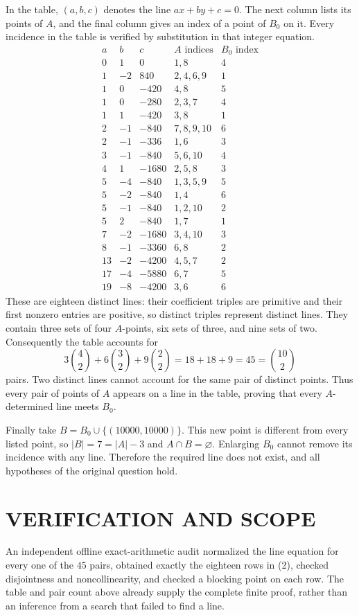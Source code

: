 In the table, $(a,b,c)$ denotes the line $ax+by+c=0$. The next column lists its points of $A$, and the final column gives an index of a point of $B_0$ on it. Every incidence in the table is verified by substitution in that integer equation.
\[
\begin{array}{r|r|r|l|c}
a&b&c&A\text{ indices}&B_0\text{ index}\\\hline
0&1&0&1,8&4\\
1&-2&840&2,4,6,9&1\\
1&0&-420&4,8&5\\
1&0&-280&2,3,7&4\\
1&1&-420&3,8&1\\
2&-1&-840&7,8,9,10&6\\
2&-1&-336&1,6&3\\
3&-1&-840&5,6,10&4\\
4&1&-1680&2,5,8&3\\
5&-4&-840&1,3,5,9&5\\
5&-2&-840&1,4&6\\
5&-1&-840&1,2,10&2\\
5&2&-840&1,7&1\\
7&-2&-1680&3,4,10&3\\
8&-1&-3360&6,8&2\\
13&-2&-4200&4,5,7&2\\
17&-4&-5880&6,7&5\\
19&-8&-4200&3,6&6
\end{array}
\tag{2}
\]
These are eighteen distinct lines: their coefficient triples are primitive and their first nonzero entries are positive, so distinct triples represent distinct lines. They contain three sets of four $A$-points, six sets of three, and nine sets of two. Consequently the table accounts for
\[
3\binom42+6\binom32+9\binom22=18+18+9=45=\binom{10}2
\]
pairs. Two distinct lines cannot account for the same pair of distinct points. Thus every pair of points of $A$ appears on a line in the table, proving that every $A$-determined line meets $B_0$.

Finally take $B=B_0\cup\{(10000,10000)\}$. This new point is different from every listed point, so $|B|=7=|A|-3$ and $A\cap B=\varnothing$. Enlarging $B_0$ cannot remove its incidence with any line. Therefore the required line does not exist, and all hypotheses of the original question hold.

\section{VERIFICATION AND SCOPE}
An independent offline exact-arithmetic audit normalized the line equation for every one of the $45$ pairs, obtained exactly the eighteen rows in (2), checked disjointness and noncollinearity, and checked a blocking point on each row. The table and pair count above already supply the complete finite proof, rather than an inference from a search that failed to find a line.


